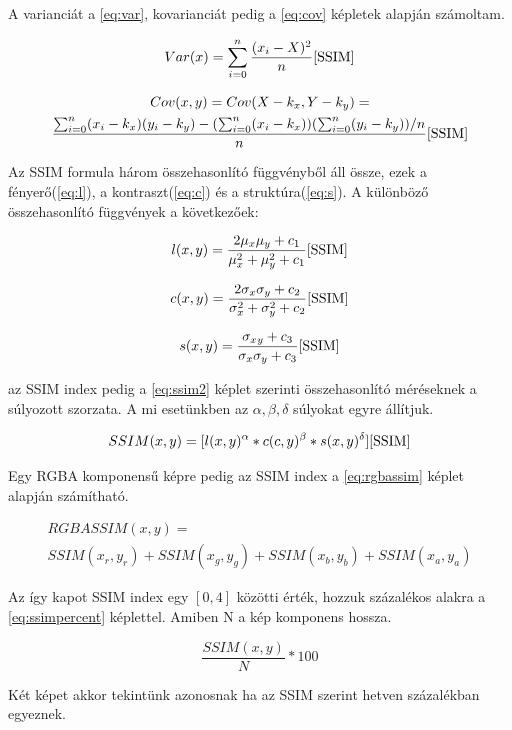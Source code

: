 A varianciát a \ref{eq:var}, kovarianciát pedig a \ref{eq:cov} képletek alapján számoltam.

\begin{equation} \label{eq:var}
    Var(x) = \sum_{i=0}^{n} \frac{(x_i - X)^2}{n}\cite{SSIM}    
\end{equation}

\begin{equation} \label{eq:cov}
    \begin{gathered} 
    Cov(x, y) = Cov(X - k_x, Y - k_y)  = \\
    \frac{\sum_{i=0}^{n}(x_i-k_x)(y_i - k_y) - (\sum_{i=0}^{n}(x_i-k_x))(\sum_{i = 0}^{n}(y_i - k_y))/n}{n}\cite{SSIM}
    \end{gathered}
\end{equation}


Az SSIM formula három összehasonlító függvényből áll össze, ezek a fényerő(\ref{eq:l}), a kontraszt(\ref{eq:c}) és a struktúra(\ref{eq:s}). A különböző összehasonlító függvények a következőek:

\begin{equation} \label{eq:l}
    l(x, y) = \frac{2\mu_x\mu_y + c_1}{\mu^2_x + \mu^2_y + c_1}\cite{SSIM}
\end{equation}

\begin{equation} \label{eq:c}
    c(x, y) = \frac{2\sigma_x\sigma_y + c_2}{\sigma^2_x + \sigma^2_y + c_2}\cite{SSIM}
\end{equation}

\begin{equation} \label{eq:s}
    s(x, y) = \frac{\sigma_x{}_y + c_3}{\sigma_x\sigma_y + c_3}\cite{SSIM}
\end{equation}


az SSIM index pedig a \ref{eq:ssim2} képlet szerinti összehasonlító méréseknek a súlyozott szorzata. A mi esetünkben az \(\alpha, \beta, \delta\) súlyokat egyre állítjuk.

\begin{equation} \label{eq:ssim2}
    SSIM(x,y) = [l(x,y)^\alpha * c(c,y)^\beta * s(x,y)^\delta]\cite{SSIM}
\end{equation}

Egy RGBA komponensű képre pedig az SSIM index a \ref{eq:rgbassim} képlet alapján számítható.

\begin{equation} \label{eq:rgbassim}
\begin{gathered}
RGBASSIM(x,y) = \\
SSIM(x_r, y_r) + SSIM(x_g, y_g) + SSIM(x_b, y_b) + SSIM(x_a, y_a)
\end{gathered}
\end{equation}

Az így kapot SSIM index egy \([0,4]\) közötti érték, hozzuk százalékos alakra a \ref{eq:ssimpercent} képlettel. Amiben N a kép komponens hossza.

\begin{equation} \label{eq:ssimpercent}
    \frac{SSIM(x,y)}{N} * 100
\end{equation}

Két képet akkor tekintünk azonosnak ha az SSIM szerint hetven százalékban egyeznek.

